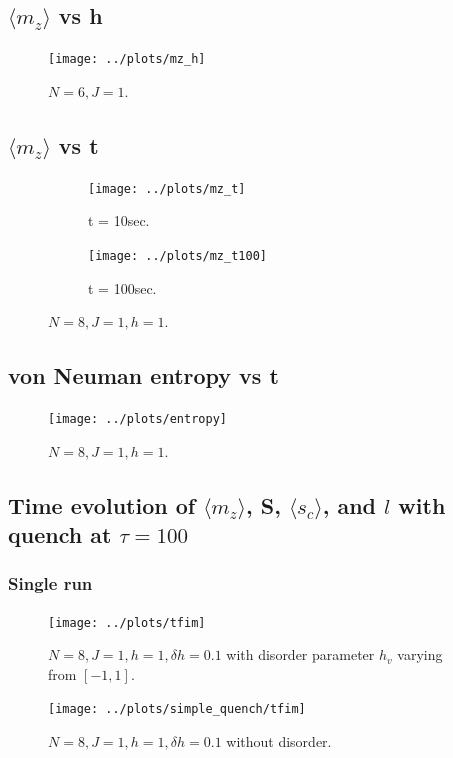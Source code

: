 \documentclass[a4paper]{article}
\begin{document}
\subsection{$\langle m_z \rangle$ vs h}
\begin{figure}[h]
  \centering
  \texttt{[image: ../plots/mz\_h]}
  \caption{$N=6, J=1$.}
\end{figure}

\subsection{$\langle m_z \rangle$ vs t}
\begin{figure}[h]
  \begin{subfigure}{.6\textwidth}
    \centering
    \texttt{[image: ../plots/mz\_t]}
    \caption{t = 10sec.}
  \end{subfigure}
  \begin{subfigure}{.6\textwidth}
    \centering
    \texttt{[image: ../plots/mz\_t100]}
    \caption{t = 100sec.}
  \end{subfigure}
  \caption{$N=8, J=1, h=1$.}
  \label{fig:}
\end{figure}

\newpage
\subsection{von Neuman entropy vs t}
\begin{figure}[h]
  \centering
  \texttt{[image: ../plots/entropy]}
  \caption{$N=8, J=1, h=1$.}
\end{figure}

\subsection{Time evolution of $\langle m_z \rangle$, S, $\langle s_c \rangle$, and $l$ with quench at $\tau=100$}
\subsubsection{Single run}
\begin{figure}[h]
  \centering
  \texttt{[image: ../plots/tfim]}
  \caption{$N = 8, J = 1, h = 1, \delta h = 0.1$ with disorder parameter $h_v$ varying from $[-1,1]$.}
  \label{fig:TFIM}
\end{figure}

\begin{figure}[h]
  \centering
  \texttt{[image: ../plots/simple\_quench/tfim]}
  \caption{$N = 8, J = 1, h = 1, \delta h = 0.1$ without disorder.}
  \label{fig:TFIM}
\end{figure}
\end{document}
